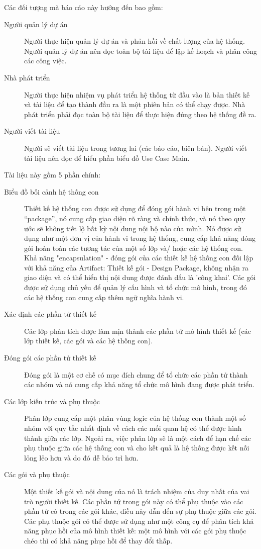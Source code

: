 \documentclass[./../main_file.tex]{subfiles}
\begin{document}
	Các đối tượng mà báo cáo này hướng đến bao gồm: 
	\begin{description}
		\item[Người quản lý dự án] Người thực hiện quản lý dự án và phản hồi về chất lượng của hệ thống. Người quản lý dự án nên đọc toàn bộ tài liệu để lập kế hoạch và phân công các công việc.
		\item[Nhà phát triển] Người thực hiện nhiệm vụ phát triển hệ thống từ đầu vào là bản thiết kế và tài liệu để tạo thành đầu ra là một phiên bản có thể chạy được. Nhà phát triển phải đọc toàn bộ tài liệu để thực hiện đúng theo hệ thống đề ra.
\item[Người viết tài liệu] Người sẽ viết tài liệu trong tương lai (các báo cáo, biên bản). Người viết tài liệu nên đọc để hiểu phần biểu đồ Use Case Main.
	\end{description}
	Tài liệu này gồm 5 phần chính:
	\begin{description}
		\item[Biểu đồ bối cảnh hệ thống con] Thiết kế hệ thống con được sử dụng để đóng gói hành vi bên trong một “package”, nó cung cấp giao diện rõ ràng và chính thức, và nó theo quy ước sẽ không tiết lộ bất kỳ nội dung nội bộ nào của mình. Nó được sử dụng như một đơn vị của hành vi trong hệ thống, cung cấp khả năng đóng gói hoàn toàn các tương tác của một số lớp và/ hoặc các hệ thống con. Khả năng "encapsulation" - đóng gói của các thiết kế hệ thống con đối lập với khả năng của Artifact: Thiết kế gói - Design Package, không nhận ra giao diện và có thể hiển thị nội dung được đánh dấu là 'công khai'. Các gói được sử dụng chủ yếu để quản lý cấu hình và tổ chức mô hình, trong đó các hệ thống con cung cấp thêm ngữ nghĩa hành vi.
		\item[Xác định các phần tử thiết kế] Các lớp phân tích được làm mịn thành các phần tử mô hình thiết kế (các lớp thiết kế, các gói và các hệ thống con).
		\item[Đóng gói các phần tử thiết kế] Đóng gói là một cơ chế có mục đích chung để tổ chức các phần tử thành các nhóm và nó cung cấp khả năng tổ chức mô hình đang được phát triển. 
		\item[Các lớp kiến trúc và phụ thuộc] Phân lớp cung cấp một phân vùng logic của hệ thống con thành một số nhóm với quy tắc nhất định về cách các mối quan hệ có thể được hình thành giữa các lớp. Ngoài ra, việc phân lớp sẽ là một cách để hạn chế các phụ thuộc giữa các hệ thống con và cho kết quả là hệ thống được kết nối lỏng lẻo hơn và do đó dễ bảo trì hơn.
		\item[Các gói và phụ thuộc] Một thiết kế gói và nội dung của nó là trách nhiệm của duy nhất của vai trò người thiết kế. Các phần tử trong gói này có thể phụ thuộc vào các phần tử có trong các gói khác, điều này dẫn đến sự phụ thuộc giữa các gói. Các phụ thuộc gói có thể được sử dụng như một công cụ để phân tích khả năng phục hồi của mô hình thiết kế: một mô hình với các gói phụ thuộc chéo thì có khả năng phục hồi để thay đổi thấp.
	\end{description}
\end{document}
